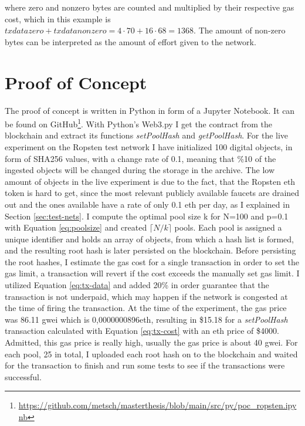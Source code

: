 
where zero and nonzero bytes are counted and multiplied by their respective gas cost, which in this example is $txdatazero+txdatanonzero = 4 \cdot 70 + 16 \cdot 68 = 1368 $. The amount of non-zero bytes can be interpreted as the amount of effort given to the network.

\section{Proof of Concept}\label{sec:poc}
The proof of concept is written in Python in form of a Jupyter Notebook. It can be found on GitHub\footnote{\url{https://github.com/metsch/masterthesis/blob/main/src/py/poc_ropsten.ipynb}}. With Python's Web3.py I get the contract from the blockchain and extract its functions \textit{setPoolHash} and \textit{getPoolHash}. For the live experiment on the Ropsten test network I have initialized 100 digital objects, in form of SHA256 values, with a change rate of 0.1, meaning that \%10 of the ingested objects will be changed during the storage in the archive. The low amount of objects in the live experiment is due to the fact, that the Ropsten \acrlong{eth} token is hard to get, since the most relevant publicly available faucets are drained out and the ones available have a rate of only 0.1 \acrlong{eth} per day, as I explained in Section \ref{sec:test-nets}. I compute the optimal pool size k for N=100 and p=0.1 with Equation \ref{eq:poolsize} and created $\lceil N/k \rceil$ pools. Each pool is assigned a unique identifier and holds an array of objects, from which a hash list is formed, and the resulting root hash is later persisted on the blockchain. 
Before persisting the root hashes, I estimate the gas cost for a single transaction in order to set the gas limit, a transaction will revert if the cost exceeds the manually set gas limit. I utilized Equation \ref{eq:tx-data} and added 20\% in order guarantee that the transaction is not underpaid, which may happen if the network is congested at the time of firing the transaction.
At the time of the experiment, the gas price was 86.11 gwei which is 0,0000000896\acrshort{eth}, resulting in \$15.18 for a \textit{setPoolHash} transaction calculated with Equation \ref{eq:tx-cost} with an \acrshort{eth} price of \$4000. Admitted, this gas price is really high, usually the gas price is about 40 gwei. 
For each pool, 25 in total, I uploaded each root hash on to the blockchain and waited for the transaction to finish and run some tests to see if the transactions were successful.
